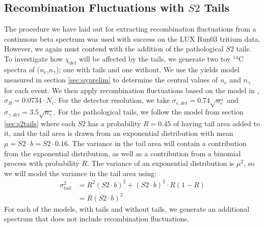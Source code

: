 \subsection{Recombination Fluctuations with $S2$ Tails}
The procedure we have laid out for extracting recombination fluctuations from a continuous beta spectrum was used with success on the LUX Run03 tritium data\cite{lux_tritium}. However, we again must contend with the addition of the pathological $S2$ tails. To investigate how $\chi_{det}$ will be affected by the tails, we generate two toy $^{14}$C spectra of ($n_{e}$,$n_{\gamma}$); one with tails and one without. We use the yields model measured in section \ref{sec:qyprelim} to determine the central values of $n_e$ and $n_{\gamma}$ for each event. We then apply recombination fluctuations based on the model in \cite{lux_tritium}, $\sigma_R=0.0734\cdot N_i$. For the detector resolution, we take $\sigma_{e,det}=0.74\sqrt{n_e}$ and $\sigma_{\gamma,det}=3.5\sqrt{n_{\gamma}}$. For the pathological tails, we follow the model from section \ref{sec:s2tails} where each $S2$ has a probability $R=0.45$ of having tail area added to it, and the tail area is drawn from an exponential distribution with mean $\mu=S2\cdot b=S2 \cdot 0.16$. The variance in the tail area will contain a contribution from the exponential distribution, as well as a contribution from a binomial process with probability $R$. The variance of an exponential distribution is $\mu^2$, so we will model the variance in the tail area using:
\begin{equation}
\begin{split}
\sigma_{tail}^2&= R^2(S2\cdot b)^2+(S2\cdot b)^2\cdot R(1-R)\\
&=R(S2\cdot b)^2
\end{split}
\end{equation}
For each of the models, with tails and without tails, we generate an additional spectrum that does not include recombination fluctuations.
